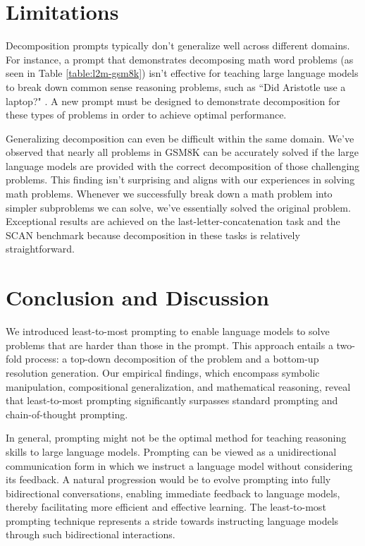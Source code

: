 \documentclass{article}
\begin{document}
\section{Limitations}
\label{sec:limit}
Decomposition prompts typically don't generalize well across different domains. For instance, a prompt that demonstrates decomposing math word problems (as seen in Table \ref{table:l2m-gsm8k}) isn't effective for teaching large language models to break down common sense reasoning problems, such as ``Did Aristotle use a laptop?" \citep{geva2021strategyqa}. A new prompt must be designed to demonstrate decomposition for these types of problems in order to achieve optimal performance.

Generalizing decomposition can even be difficult within the same domain. We've observed that nearly all problems in GSM8K can be accurately solved if the large language models are provided with the correct decomposition of those challenging problems. This finding isn't surprising and aligns with our experiences in solving math problems. Whenever we successfully break down a math problem into simpler subproblems we can solve, we've essentially solved the original problem. Exceptional results are achieved on the last-letter-concatenation task and the SCAN benchmark because decomposition in these tasks is relatively straightforward.  

 

\section{Conclusion and Discussion}
We introduced least-to-most prompting to enable language models to solve problems that are harder than those in the prompt. This approach entails a two-fold process: a top-down decomposition of the problem and a bottom-up resolution generation. Our empirical findings, which encompass symbolic manipulation, compositional generalization, and mathematical reasoning, reveal that least-to-most prompting significantly surpasses standard prompting and chain-of-thought prompting.

In general, prompting might not be the optimal method for teaching reasoning skills to large language models. Prompting can be viewed as a unidirectional communication form in which we instruct a language model without considering its feedback. A natural progression would be to evolve prompting into fully bidirectional conversations, enabling immediate feedback to language models, thereby facilitating more efficient and effective learning. The least-to-most prompting technique represents a stride towards instructing language models through such bidirectional interactions.
\end{document}
